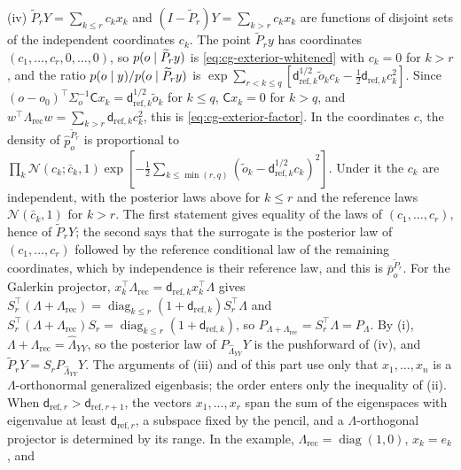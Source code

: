 (iv) \(\widetilde P_rY=\sum_{k\leq r}c_kx_k\) and
\((I-\widetilde P_r)Y=\sum_{k>r}c_kx_k\) are functions of disjoint sets of the
independent coordinates \(c_k\). The point \(\widetilde P_ry\) has coordinates
\((c_1,\ldots,c_r,0,\ldots,0)\), so \(p(o\mid\widetilde P_ry)\) is
\eqref{eq:cg-exterior-whitened} with \(c_k=0\) for \(k>r\), and the ratio
\(p(o\mid y)/p(o\mid\widetilde P_ry)\) is
\(\exp\sum_{r<k\leq q}[\mathsf d_{\mathrm{ref},k}^{1/2}\tilde o_kc_k-\frac12\mathsf d_{\mathrm{ref},k}c_k^2]\).
Since \((o-o_0)^\top\Sigma_o^{-1}\mathsf Cx_k=\mathsf d_{\mathrm{ref},k}^{1/2}\tilde o_k\)
for \(k\leq q\), \(\mathsf Cx_k=0\) for \(k>q\), and
\(w^\top\Lambda_{\mathrm{rec}}w=\sum_{k>r}\mathsf d_{\mathrm{ref},k}c_k^2\), this is
\eqref{eq:cg-exterior-factor}. In the coordinates \(c\), the density of
\(\widehat p^{\widetilde P_r}_o\) is proportional to
\(\prod_k\mathcal N(c_k;\bar c_k,1)\exp[-\frac12\sum_{k\leq\min(r,q)}(\tilde o_k-\mathsf d_{\mathrm{ref},k}^{1/2}c_k)^2]\).
Under it the \(c_k\) are independent, with the posterior laws above for
\(k\leq r\) and the reference laws \(\mathcal N(\bar c_k,1)\) for \(k>r\). The first
statement gives equality of the laws of \((c_1,\ldots,c_r)\), hence of
\(\widetilde P_rY\); the second says that the surrogate is the posterior law of
\((c_1,\ldots,c_r)\) followed by the reference conditional law of the remaining
coordinates, which by independence is their reference law, and this is
\(\bar p^{\widetilde P_r}_o\). For the Galerkin projector,
\(x_k^\top\Lambda_{\mathrm{rec}}=\mathsf d_{\mathrm{ref},k}x_k^\top\Lambda\) gives
\(S_r^\top(\Lambda+\Lambda_{\mathrm{rec}})=\operatorname{diag}_{k\leq r}(1+\mathsf d_{\mathrm{ref},k})S_r^\top\Lambda\)
and
\(S_r^\top(\Lambda+\Lambda_{\mathrm{rec}})S_r=\operatorname{diag}_{k\leq r}(1+\mathsf d_{\mathrm{ref},k})\),
so \(P_{\Lambda+\Lambda_{\mathrm{rec}}}=S_r^\top\Lambda=P_\Lambda\). By (i),
\(\Lambda+\Lambda_{\mathrm{rec}}=\widehat\Lambda_{YY}\), so the posterior law of
\(P_{\widehat\Lambda_{YY}}Y\) is the pushforward of
(iv), and \(\widetilde P_rY=S_rP_{\widehat\Lambda_{YY}}Y\).
The arguments of (iii) and of this part use only that \(x_1,\ldots,x_n\) is a
\(\Lambda\)-orthonormal generalized eigenbasis; the order enters only the
inequality of (ii). When \(\mathsf d_{\mathrm{ref},r}>\mathsf d_{\mathrm{ref},r+1}\),
the vectors \(x_1,\ldots,x_r\) span the sum of the eigenspaces with eigenvalue
at least \(\mathsf d_{\mathrm{ref},r}\), a subspace fixed by the pencil,
and a \(\Lambda\)-orthogonal projector is determined by its range. In the
example, \(\Lambda_{\mathrm{rec}}=\operatorname{diag}(1,0)\), \(x_k=e_k\), and
